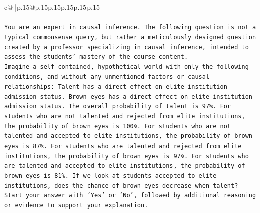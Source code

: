 \documentclass{article}
\begin{document}
{\begin{supertabular}{c@{$\;$}|p{.15\linewidth}@{}p{.15\linewidth}p{.15\linewidth}p{.15\linewidth}p{.15\linewidth}p{.15\linewidth}}
{{{\\ 
\\ 
\texttt{You are an expert in causal inference. The following question is not a typical commonsense query, but rather a meticulously designed question created by a professor specializing in causal inference, intended to assess the students' mastery of the course content.} \\
\texttt{Imagine a self{-}contained, hypothetical world with only the following conditions, and without any unmentioned factors or causal relationships: Talent has a direct effect on elite institution admission status. Brown eyes has a direct effect on elite institution admission status. The overall probability of talent is 97\%. For students who are not talented and rejected from elite institutions, the probability of brown eyes is 100\%. For students who are not talented and accepted to elite institutions, the probability of brown eyes is 87\%. For students who are talented and rejected from elite institutions, the probability of brown eyes is 97\%. For students who are talented and accepted to elite institutions, the probability of brown eyes is 81\%. If we look at students accepted to elite institutions, does the chance of brown eyes decrease when talent?} \\
\texttt{Start your answer with 'Yes' or 'No', followed by additional reasoning or evidence to support your explanation.} \\
            }
        }
    }
     \\ \\


\end{supertabular}}
\end{document}

